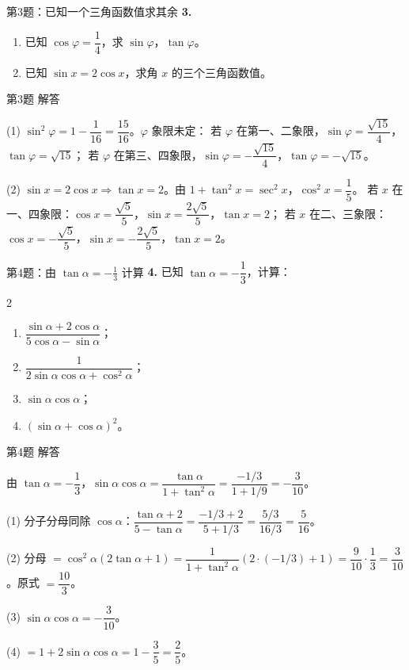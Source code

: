 \documentclass[10pt,aspectratio=169,serif]{beamer}
\begin{document}
\begin{frame}[t]{第3题：已知一个三角函数值求其余}
\textbf{3.}
\begin{enumerate}
  \item 已知 $\cos\varphi=\dfrac14$，求 $\sin\varphi$，$\tan\varphi$。
  \item 已知 $\sin x=2\cos x$，求角 $x$ 的三个三角函数值。
\end{enumerate}
\end{frame}

\begin{frame}[t]{第3题 解答}
\begin{tcolorbox}[colback=orange!10,colframe=orange,title=\textbf{解}]
(1) $\sin^2\varphi=1-\dfrac1{16}=\dfrac{15}{16}$。$\varphi$ 象限未定：
若 $\varphi$ 在第一、二象限，$\sin\varphi=\dfrac{\sqrt{15}}{4}$，$\tan\varphi=\sqrt{15}$；
若 $\varphi$ 在第三、四象限，$\sin\varphi=-\dfrac{\sqrt{15}}{4}$，$\tan\varphi=-\sqrt{15}$。

(2) $\sin x=2\cos x\Rightarrow\tan x=2$。由 $1+\tan^2 x=\sec^2 x$，$\cos^2 x=\dfrac15$。
若 $x$ 在一、四象限：$\cos x=\dfrac{\sqrt5}{5}$，$\sin x=\dfrac{2\sqrt5}{5}$，$\tan x=2$；
若 $x$ 在二、三象限：$\cos x=-\dfrac{\sqrt5}{5}$，$\sin x=-\dfrac{2\sqrt5}{5}$，$\tan x=2$。
\end{tcolorbox}
\end{frame}

\begin{frame}[t]{第4题：由 $\tan\alpha=-\frac13$ 计算}
\textbf{4.} 已知 $\tan\alpha=-\dfrac13$，计算：
\begin{multicols}{2}
\begin{enumerate}
  \item $\dfrac{\sin\alpha+2\cos\alpha}{5\cos\alpha-\sin\alpha}$；
  \item $\dfrac{1}{2\sin\alpha\cos\alpha+\cos^2\alpha}$；
  \item $\sin\alpha\cos\alpha$；
  \item $(\sin\alpha+\cos\alpha)^2$。
\end{enumerate}
\end{multicols}
\end{frame}

\begin{frame}[t]{第4题 解答}
\begin{tcolorbox}[colback=orange!10,colframe=orange,title=\textbf{解}]
由 $\tan\alpha=-\dfrac13$，$\sin\alpha\cos\alpha=\dfrac{\tan\alpha}{1+\tan^2\alpha}=\dfrac{-1/3}{1+1/9}=-\dfrac{3}{10}$。

(1) 分子分母同除 $\cos\alpha$：$\dfrac{\tan\alpha+2}{5-\tan\alpha}=\dfrac{-1/3+2}{5+1/3}=\dfrac{5/3}{16/3}=\dfrac{5}{16}$。

(2) 分母 $=\cos^2\alpha(2\tan\alpha+1)=\dfrac{1}{1+\tan^2\alpha}(2\cdot(-1/3)+1)=\dfrac{9}{10}\cdot\dfrac13=\dfrac{3}{10}$。原式 $=\dfrac{10}{3}$。

(3) $\sin\alpha\cos\alpha=-\dfrac{3}{10}$。

(4) $=1+2\sin\alpha\cos\alpha=1-\dfrac{3}{5}=\dfrac{2}{5}$。
\end{tcolorbox}
\end{frame}
\end{document}
